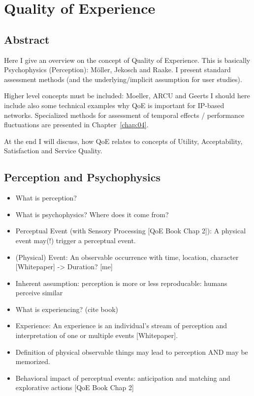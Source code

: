 \chapter{Quality of Experience}
\section*{Abstract}
Here I give an overview on the concept of Quality of Experience.
This is basically Psychophysics (Perception): Möller, Jekosch and Raake.
I present standard assessment methods (and the underlying/implicit assumption for user studies).

Higher level concepts must be included: Moeller, ARCU and Geerts
I should here include also some technical examples why QoE is important for IP-based networks.
Specialized methods for assessment of temporal effects / performance fluctuations are presented in Chapter~\ref{chap:04}.

At the end I will discuss, how QoE relates to concepts of Utility, Acceptability, Satisfaction and Service Quality.

\section{Perception and Psychophysics}
\begin{itemize}
\item What is perception?
\item What is psychophysics? Where does it come from?
\item Perceptual Event (with Sensory Processing [QoE Book Chap 2]): A physical event may(!) trigger a perceptual event.
\item (Physical) Event: An observable occurrence with time, location, character [Whitepaper] -> Duration? [me]
\item Inherent assumption: perception is more or less reproducable: humans perceive similar

\item What is experiencing? (cite book)
\item Experience: An experience is an individual's stream of perception and interpretation of one or multiple events [Whitepaper].
\item Definition of physical observable things may lead to perception AND may be memorized.
\item Behavioral impact of perceptual events: anticipation and matching and explorative actions [QoE Book Chap 2]
\end{itemize}

